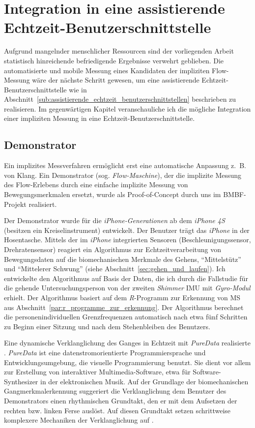 \chapter{Integration in eine assistierende Echtzeit-Benutzerschnittstelle}
\label{cha:integration_in_eine_assistierende_echtzeit_benutzerschnittstelle}
Aufgrund mangelnder menschlicher Ressourcen sind der vorliegenden Arbeit statistisch hinreichende befriedigende Ergebnisse verwehrt geblieben. Die automatisierte und mobile Messung eines Kandidaten der impliziten Flow-Messung wäre der nächste Schritt gewesen, um eine assistierende Echtzeit-Benutzerschnittstelle wie in Abschnitt~\ref{sub:assistierende_echtzeit_benutzerschnittstellen} beschrieben zu realisieren. Im gegenwärtigen Kapitel veranschauliche ich die mögliche Integration einer impliziten Messung in eine Echtzeit-Benutzerschnittstelle.

\section{Demonstrator}
\label{sec:demonstrator}
Ein implizites Messverfahren ermöglicht erst eine automatische Anpassung z.~B. von Klang. Ein Demonstrator (sog. \emph{Flow-Maschine}), der die implizite Messung des Flow-Erlebens durch eine einfache implizite Messung von Bewegungsmerkmalen ersetzt, wurde als Proof-of-Concept durch uns im \acs{BMBF}-Projekt realisiert.

Der Demonstrator wurde für die \emph{iPhone-Generationen} ab dem \emph{iPhone 4S} (besitzen ein Kreiselinstrument) entwickelt. Der Benutzer trägt das \emph{iPhone} in der Hosentasche. Mittels der im \emph{iPhone} integrierten Sensoren (Beschleunigungssensor, Drehratensensor) reagiert ein Algorithmus zur Echtzeitverarbeitung von Bewegungsdaten auf die biomechanischen Merkmale des Gehens, "`Mittelstütz"' und "`Mittelerer Schwung"' (siehe Abschnitt~\ref{sec:gehen_und_laufen}). Ich entwickelte den Algorithmus auf Basis der Daten, die ich durch die Fallstudie für die gehende Untersuchungsperson von der zweiten \emph{Shimmer} \ac{IMU} mit \emph{Gyro-Modul} erhielt. Der Algorithmus basiert auf dem \emph{R}-Programm zur Erkennung von \ac{MS} aus Abschnitt~\ref{par:r_programme_zur_erkennung}. Der Algorithmus berechnet die personenindividuellen Grenzfrequenzen automatisch nach etwa fünf Schritten zu Beginn einer Sitzung und nach dem Stehenbleiben des Benutzers.

Eine dynamische Verklanglichung des Ganges in Echtzeit mit \emph{PureData} realisierte \citet{Hajinejad}. \emph{PureData} ist eine datenstromorientierte Programmiersprache und Entwicklungsumgebung, die visuelle Programmierung benutzt. Sie dient vor allem zur Erstellung von interaktiver Multimedia-Software, etwa für Software-Synthesizer in der elektronischen Musik. Auf der Grundlage der biomechanischen Gangmerkmalerkennung suggeriert die Verklanglichung dem Benutzer des Demonstrators einen rhythmischen Grundtakt, den er mit dem Aufsetzen der rechten bzw. linken Ferse auslöst. Auf diesen Grundtakt setzen schrittweise komplexere Mechaniken der Verklanglichung auf \citep[vgl.][]{Hajinejad}.

